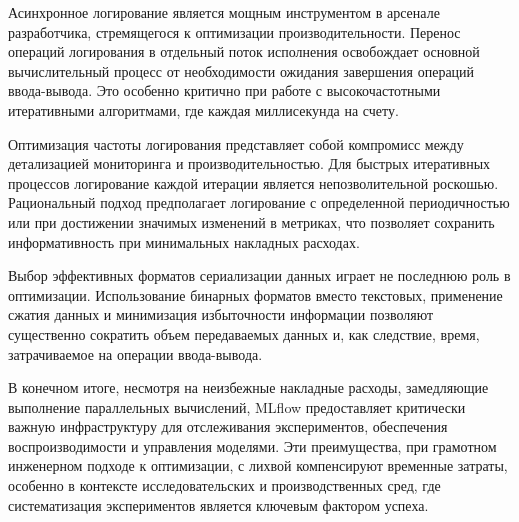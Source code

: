 Асинхронное логирование является мощным инструментом в арсенале разработчика,
стремящегося к оптимизации производительности. Перенос операций логирования в
отдельный поток исполнения освобождает основной вычислительный процесс от
необходимости ожидания завершения операций ввода-вывода. Это особенно критично
при работе с высокочастотными итеративными алгоритмами, где каждая миллисекунда
на счету.

Оптимизация частоты логирования представляет собой компромисс между детализацией
мониторинга и производительностью. Для быстрых итеративных процессов логирование
каждой итерации является непозволительной роскошью. Рациональный подход
предполагает логирование с определенной периодичностью или при достижении
значимых изменений в метриках, что позволяет сохранить информативность при
минимальных накладных расходах.

Выбор эффективных форматов сериализации данных играет не последнюю роль в
оптимизации. Использование бинарных форматов вместо текстовых, применение сжатия
данных и минимизация избыточности информации позволяют существенно сократить
объем передаваемых данных и, как следствие, время, затрачиваемое на операции
ввода-вывода.

В конечном итоге, несмотря на неизбежные накладные расходы, замедляющие
выполнение параллельных вычислений, MLflow предоставляет критически важную
инфраструктуру для отслеживания экспериментов, обеспечения воспроизводимости и
управления моделями. Эти преимущества, при грамотном инженерном подходе к
оптимизации, с лихвой компенсируют временные затраты, особенно в контексте
исследовательских и производственных сред, где систематизация экспериментов
является ключевым фактором успеха.
